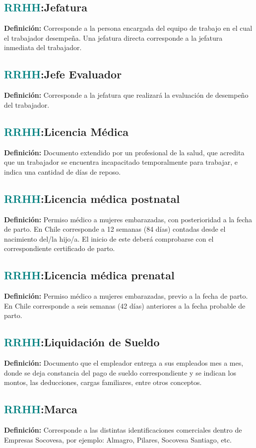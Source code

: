 \documentclass[12pt]{article}
\begin{document}
\subsection{\textcolor{teal}{RRHH}:{Jefatura}}
\textbf{Definición:} Corresponde a la persona encargada del equipo de trabajo en el cual el trabajador desempeña. Una jefatura directa corresponde a la jefatura inmediata del trabajador.
\subsection{\textcolor{teal}{RRHH}:{Jefe Evaluador}}
\textbf{Definición:} Corresponde a la jefatura que realizará la evaluación de desempeño del trabajador.
\subsection{\textcolor{teal}{RRHH}:{Licencia Médica}}
\textbf{Definición:} Documento extendido por un profesional de la salud, que acredita que un trabajador se encuentra incapacitado temporalmente para trabajar, e indica una cantidad de días de reposo.
\subsection{\textcolor{teal}{RRHH}:{Licencia médica postnatal}}
\textbf{Definición:} Permiso médico a mujeres embarazadas, con posterioridad a la fecha de parto. En Chile corresponde a 12 semanas (84 días) contadas desde el nacimiento del/la hijo/a. El inicio de este deberá comprobarse con el correspondiente certificado de parto.
\subsection{\textcolor{teal}{RRHH}:{Licencia médica prenatal}}
\textbf{Definición:} Permiso médico a mujeres embarazadas, previo a la fecha de parto. En Chile corresponde a seis semanas (42 días) anteriores a la fecha probable de parto.
\subsection{\textcolor{teal}{RRHH}:{Liquidación de Sueldo}}
\textbf{Definición:} Documento que el empleador entrega a sus empleados mes a mes, donde se deja constancia del pago de sueldo correspondiente y se indican los montos, las deducciones, cargas familiares, entre otros conceptos.
\subsection{\textcolor{teal}{RRHH}:{Marca}}
\textbf{Definición:} Corresponde a las distintas identificaciones comerciales dentro de Empresas Socovesa, por ejemplo: Almagro, Pilares, Socovesa Santiago, etc.
\end{document}
